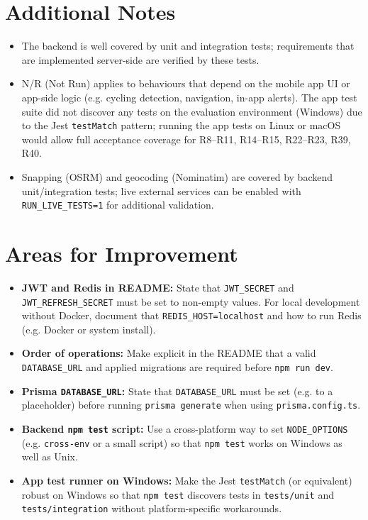 \section{Additional Notes}
\label{sec:additional_notes}
\begin{itemize}
    \item The backend is well covered by unit and integration tests; requirements that are implemented server-side are verified by these tests.
    \item N/R (Not Run) applies to behaviours that depend on the mobile app UI or app-side logic (e.g. cycling detection, navigation, in-app alerts). The app test suite did not discover any tests on the evaluation environment (Windows) due to the Jest \texttt{testMatch} pattern; running the app tests on Linux or macOS would allow full acceptance coverage for R8--R11, R14--R15, R22--R23, R39, R40.
    \item Snapping (OSRM) and geocoding (Nominatim) are covered by backend unit/integration tests; live external services can be enabled with \texttt{RUN\_LIVE\_TESTS=1} for additional validation.
\end{itemize}

\section{Areas for Improvement}
\label{sec:areas_for_improvement}
\begin{itemize}
    \item \textbf{JWT and Redis in README:} State that \texttt{JWT\_SECRET} and \texttt{JWT\_REFRESH\_SECRET} must be set to non-empty values. For local development without Docker, document that \texttt{REDIS\_HOST=localhost} and how to run Redis (e.g. Docker or system install).
    \item \textbf{Order of operations:} Make explicit in the README that a valid \texttt{DATABASE\_URL} and applied migrations are required before \texttt{npm run dev}.
    \item \textbf{Prisma \texttt{DATABASE\_URL}:} State that \texttt{DATABASE\_URL} must be set (e.g. to a placeholder) before running \texttt{prisma generate} when using \texttt{prisma.config.ts}.
    \item \textbf{Backend \texttt{npm test} script:} Use a cross-platform way to set \texttt{NODE\_OPTIONS} (e.g. \texttt{cross-env} or a small script) so that \texttt{npm test} works on Windows as well as Unix.
    \item \textbf{App test runner on Windows:} Make the Jest \texttt{testMatch} (or equivalent) robust on Windows so that \texttt{npm test} discovers tests in \texttt{tests/unit} and \texttt{tests/integration} without platform-specific workarounds.
\end{itemize}
